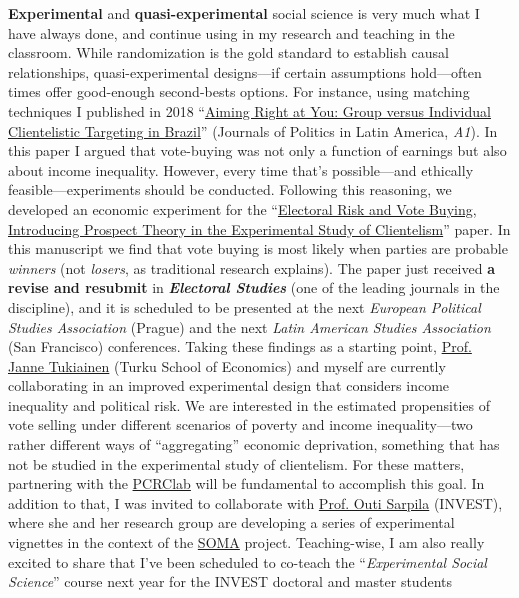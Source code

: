 \documentclass[10pt,stdletter,dateno,sigleft]{newlfm} %
\begin{document}
\begin{newlfm}
{\bf Experimental} and {\bf quasi-experimental} social science is very much what I have always done, and continue using in my research and teaching in the classroom. While randomization is the gold standard to establish causal relationships, quasi-experimental designs---if certain assumptions hold---often times offer good-enough second-bests options. For instance, using matching techniques I published in 2018 ``\href{https://journals.sub.uni-hamburg.de/giga/jpla/article/view/1121/1128}{Aiming Right at You: Group versus Individual Clientelistic Targeting in Brazil}'' (Journals of Politics in Latin America, \emph{A1}). In this paper I argued that vote-buying was not only a function of earnings but also about income inequality. However, every time that's possible---and ethically feasible---experiments should be conducted. Following this reasoning, we developed an economic experiment for the ``\href{https://github.com/hbahamonde/Economic_Experiment_Vote_Selling/raw/master/Vote_Selling_Bahamonde_Canales_Paper.pdf}{Electoral Risk and Vote Buying, Introducing Prospect Theory in the Experimental Study of Clientelism}'' paper. In this manuscript we find that vote buying is most likely when parties are probable \emph{winners} (not \emph{losers}, as traditional research explains). The paper just received  {\bf a revise and resubmit} in {\bf \emph{Electoral Studies}} (one of the leading journals in the discipline), and it is scheduled to be presented at the next \emph{European Political Studies Association} (Prague) and the next \emph{Latin American Studies Association} (San Francisco) conferences. Taking these findings as a starting point, \href{https://www.utu.fi/en/people/janne-tukiainen}{Prof. Janne Tukiainen} (Turku School of Economics) and myself are currently collaborating in an improved experimental design that considers income inequality and political risk. We are interested in the estimated propensities of vote selling under different scenarios of poverty and income inequality---two rather different ways of ``aggregating'' economic deprivation, something that has not be studied in the experimental study of clientelism. For these matters, partnering with the \href{https://pcrclab.utu.fi/?page_id=894&lang=en}{PCRClab} will be fundamental to accomplish this goal. In addition to that, I was invited to collaborate with \href{https://www.utu.fi/en/people/outi-sarpila}{Prof. Outi Sarpila} (INVEST), where she and her research group are developing a series of experimental vignettes in the context of the \href{https://soma.utu.fi}{SOMA} project. Teaching-wise, I am also really excited to share that I've been scheduled to co-teach the ``\emph{Experimental Social Science}'' course next year for the INVEST doctoral and master students


\end{newlfm}
\end{document}
